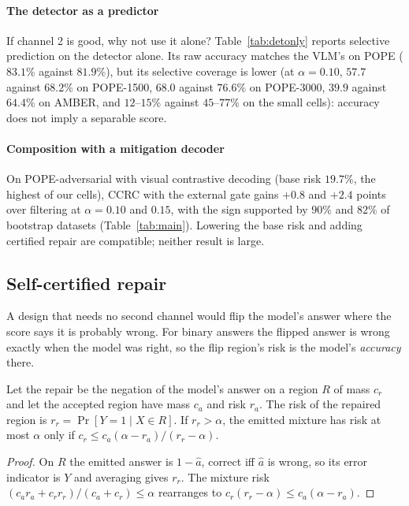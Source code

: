 \paragraph{The detector as a predictor}
If channel 2 is good, why not use it alone? Table~\ref{tab:detonly} reports selective prediction on the detector
alone. Its raw accuracy matches the VLM's on POPE ($83.1\%$ against $81.9\%$), but its selective coverage is lower
(at $\alpha=0.10$, $57.7$ against $68.2\%$ on POPE-1500, $68.0$ against $76.6\%$ on POPE-3000, $39.9$ against $64.4\%$ on AMBER, and $12$--$15\%$ against $45$--$77\%$ on
the small cells): accuracy does not imply a separable score.

\begin{table}[t]
\centering
\caption{Certified coverage (\%) of VLM filtering, CCRC (external gate) and detector-only selective prediction,
and the detector's accuracy on grounded items.}
\label{tab:detonly}
\small
\resizebox{\textwidth}{!}{}
\end{table}

\paragraph{Composition with a mitigation decoder}
On POPE-adversarial with visual contrastive decoding \citep{vcd} (base risk $19.7\%$, the highest of our cells),
CCRC with the external gate gains $+0.8$ and $+2.4$ points over filtering at $\alpha=0.10$ and $0.15$, with the
sign supported by $90\%$ and $82\%$ of bootstrap datasets (Table~\ref{tab:main}). Lowering the base risk and
adding certified repair are compatible; neither result is large.

\subsection{Self-certified repair}
\label{sec:selfrepair}

A design that needs no second channel would flip the model's answer where the score says it is probably wrong.
For binary answers the flipped answer is wrong exactly when the model was right, so the flip region's risk
is the model's \emph{accuracy} there.

\begin{proposition}
\label{prop:selfrepair}
Let the repair be the negation of the model's answer on a region $R$ of mass $c_r$ and let the accepted region have
mass $c_a$ and risk $r_a$. The risk of the repaired region is $r_r=\Pr[Y=1\mid X\in R]$. If $r_r>\alpha$, the
emitted mixture has risk at most $\alpha$ only if $c_r\le c_a(\alpha-r_a)/(r_r-\alpha)$.
\end{proposition}
\begin{proof}
On $R$ the emitted answer is $1-\hat a$, correct iff $\hat a$ is wrong, so its error indicator is $Y$ and averaging gives
$r_r$. The mixture risk $(c_ar_a+c_rr_r)/(c_a+c_r)\le\alpha$ rearranges to $c_r(r_r-\alpha)\le c_a(\alpha-r_a)$.
\end{proof}


